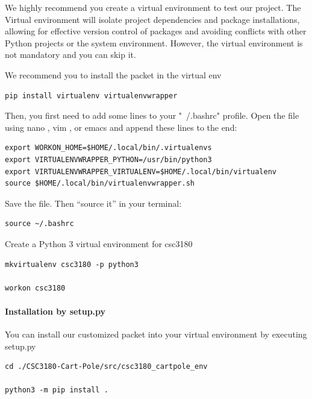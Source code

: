 \documentclass[10pt,a4paper]{article}
\begin{document}
We highly recommend you create a virtual environment to test our project. The Virtual environment will isolate project dependencies and package installations, allowing for effective version control of packages and avoiding conflicts with other Python projects or the system environment. However, the virtual environment is not mandatory and you can skip it.

We recommend you to install the packet in the virtual env

\begin{lstlisting}[caption={Installation of virtualenv}]
pip install virtualenv virtualenvwrapper
\end{lstlisting}

Then, you first need to add some lines to your "~/.bashrc" profile. Open the file using nano , vim , or emacs and append these lines to the end:

\begin{lstlisting}[caption={Setup of Environment Path}]
export WORKON_HOME=$HOME/.local/bin/.virtualenvs
export VIRTUALENVWRAPPER_PYTHON=/usr/bin/python3
export VIRTUALENVWRAPPER_VIRTUALENV=$HOME/.local/bin/virtualenv
source $HOME/.local/bin/virtualenvwrapper.sh
\end{lstlisting}

Save the file. Then “source it” in your terminal:

\begin{lstlisting}[caption={Setup of Environment Path}]
source ~/.bashrc
\end{lstlisting}

Create a Python 3 virtual environment for csc3180

\begin{lstlisting}[caption={Create a Virtual-Env}]
mkvirtualenv csc3180 -p python3

workon csc3180
\end{lstlisting}


\paragraph{Installation by setup.py}

You can install our customized packet into your virtual environment by executing setup.py

\begin{lstlisting}[caption={To use setup.py to install our env packet}]
cd ./CSC3180-Cart-Pole/src/csc3180_cartpole_env

python3 -m pip install .
\end{lstlisting}
\end{document}
